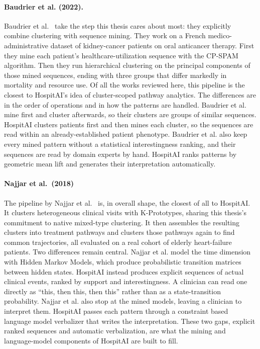 \paragraph{Baudrier et al. (2022).}
Baudrier et al.~\cite{baudrier2022} take the step this thesis cares about most: they explicitly combine clustering with sequence mining.
They work on a French medico-administrative dataset of kidney-cancer patients on oral anticancer therapy.
First they mine each patient's healthcare-utilization sequence with the CP-SPAM algorithm. Then they run hierarchical clustering on the principal components of those mined sequences, ending with three groups that differ markedly in mortality and resource use.
Of all the works reviewed here, this pipeline is the closest to HospitAI's idea of cluster-scoped pathway analytics.
The differences are in the order of operations and in how the patterns are handled.
Baudrier et al. mine first and cluster afterwards, so their clusters are groups of similar sequences. HospitAI clusters patients first and then mines each cluster, so the sequences are read within an already-established patient phenotype.
Baudrier et al. also keep every mined pattern without a statistical interestingness ranking, and their sequences are read by domain experts by hand. HospitAI ranks patterns by geometric mean lift and generates their interpretation automatically.

\paragraph{Najjar et al.~(2018)}
The pipeline by Najjar et al.~\cite{najjar2018} is, in overall shape, the closest of all to HospitAI.
It clusters heterogeneous clinical visits with K-Prototypes, sharing this thesis's commitment to native mixed-type clustering. It then assembles the resulting clusters into treatment pathways and clusters those pathways again to find common trajectories, all evaluated on a real cohort of elderly heart-failure patients.
Two differences remain central.
Najjar et al. model the time dimension with Hidden Markov Models, which produce probabilistic transition matrices between hidden states. HospitAI instead produces explicit sequences of actual clinical events, ranked by support and interestingness. A clinician can read one directly as ``this, then this, then this'' rather than as a state-transition probability.
Najjar et al. also stop at the mined models, leaving a clinician to interpret them. HospitAI passes each pattern through a constraint based language model verbalizer that writes the interpretation.
These two gaps, explicit ranked sequences and automatic verbalization, are what the mining and language-model components of HospitAI are built to fill.

